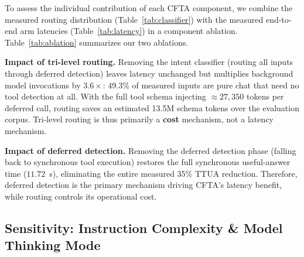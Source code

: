 \documentclass[numbered,mediumone,traditional]{oup-authoring-template}
\begin{document}
To assess the individual contribution of each CFTA component, we combine the measured routing distribution (Table~\ref{tab:classifier}) with the measured end-to-end arm latencies (Table~\ref{tab:latency}) in a component ablation. Table~\ref{tab:ablation} summarizes our two ablations.

\begin{table}[htbp]
\caption{Ablation analysis ($n = 1{,}000$ routed inputs for call/token counts; latency from the end-to-end A/B, Table~\ref{tab:latency}).}
\label{tab:ablation}
\centering
\footnotesize
{}
\end{table}

\textbf{Impact of tri-level routing.} Removing the intent classifier (routing all inputs through deferred detection) leaves latency unchanged but multiplies background model invocations by $3.6\times$: 49.3\% of measured inputs are pure chat that need no tool detection at all. With the full tool schema injecting $\approx 27{,}350$ tokens per deferred call, routing saves an estimated 13.5M schema tokens over the evaluation corpus. Tri-level routing is thus primarily a \textbf{cost} mechanism, not a latency mechanism.

\textbf{Impact of deferred detection.} Removing the deferred detection phase (falling back to synchronous tool execution) restores the full synchronous useful-answer time ($11.72$~s), eliminating the entire measured 35\% TTUA reduction. Therefore, deferred detection is the primary mechanism driving CFTA's latency benefit, while routing controls its operational cost.

\subsection{Sensitivity: Instruction Complexity \& Model Thinking Mode}\label{sec:sensitivity}
\end{document}
